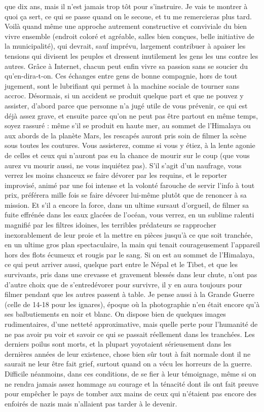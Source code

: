 que dix ans, mais il n’est jamais trop tôt pour s’instruire. Je vais te montrer à quoi ça sert, ce qui se passe quand on le secoue, et tu me remercieras plus tard. Voilà quand même une approche autrement constructive et conviviale du bien vivre ensemble (endroit coloré et agréable, salles bien conçues, belle initiative de la municipalité), qui devrait, sauf imprévu, largement contribuer à apaiser les tensions qui divisent les peuples et dressent inutilement les gens les uns contre les autres. Grâce à Internet, chacun peut enfin vivre sa passion sans se soucier du qu’en-dira-t-on. Ces échanges entre gens de bonne compagnie, hors de tout jugement, sont le lubrifiant qui permet à la machine sociale de tourner sans accroc. Désormais, si un accident se produit quelque part et que ne pouvez y assister, d’abord parce que personne n’a jugé utile de vous prévenir, ce qui est déjà assez grave, et ensuite parce qu’on ne peut pas être partout en même temps, soyez rassuré : même s’il se produit en haute mer, au sommet de l’Himalaya ou aux abords de la planète Mars, les rescapés auront pris soin de filmer la scène sous toutes les coutures. Vous assisterez, comme si vous y étiez, à la lente agonie de celles et ceux qui n’auront pas eu la chance de mourir sur le coup (que vous aurez vu mourir aussi, ne vous inquiétez pas). S’il s’agit d’un naufrage, vous verrez les moins chanceux se faire dévorer par les requins, et le reporter improvisé, animé par une foi intense et la volonté farouche de servir l’info à tout prix, préférera mille fois se faire dévorer lui-même plutôt que de renoncer à sa mission. Et s’il a encore la force, dans un ultime sursaut d’orgueil, de filmer sa fuite effrénée dans les eaux glacées de l’océan, vous verrez, en un sublime ralenti magnifié par les filtres idoines, les terribles prédateurs se rapprocher inexorablement de leur proie et la mettre en pièces jusqu’à ce que soit tranchée, en un ultime gros plan spectaculaire, la main qui tenait courageusement l’appareil hors des flots écumeux et rougis par le sang. Si on est au sommet de l’Himalaya, ce qui peut arriver aussi, quelque part entre le Népal et le Tibet, et que les survivants, pris dans une crevasse et gravement blessés dans leur chute, n’ont pas d’autre choix que de s’entredévorer pour survivre, il y en aura toujours pour filmer pendant que les autres passent à table. Je pense aussi à la Grande Guerre (celle de 14-18 pour les ignares), époque où la photographie n’en était encore qu’à ses balbutiements en noir et blanc. On dispose bien de quelques images rudimentaires, d’une netteté approximative, mais quelle perte pour l’humanité de ne pas avoir pu voir et savoir ce qui se passait réellement dans les tranchées. Les derniers poilus sont morts, et la plupart yoyotaient sérieusement dans les dernières années de leur existence, chose bien sûr tout à fait normale dont il ne saurait ne leur être fait grief, surtout quand on a vécu les horreurs de la guerre. Difficile néanmoins, dans ces conditions, de se fier à leur témoignage, même si on ne rendra jamais assez hommage au courage et la ténacité dont ils ont fait preuve pour empêcher le pays de tomber aux mains de ceux qui n’étaient pas encore des enfoirés de nazis mais n’allaient pas tarder à le devenir. 

